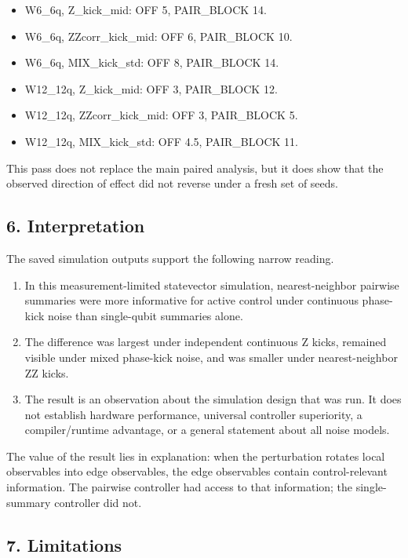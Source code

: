 \documentclass[
]{article}
\providecommand{\tightlist}{%
  \setlength{\itemsep}{0pt}\setlength{\parskip}{0pt}}
\begin{document}
\begin{itemize}
\tightlist
\item
  W6\_6q, Z\_kick\_mid: OFF 5, PAIR\_BLOCK 14.
\item
  W6\_6q, ZZcorr\_kick\_mid: OFF 6, PAIR\_BLOCK 10.
\item
  W6\_6q, MIX\_kick\_std: OFF 8, PAIR\_BLOCK 14.
\item
  W12\_12q, Z\_kick\_mid: OFF 3, PAIR\_BLOCK 12.
\item
  W12\_12q, ZZcorr\_kick\_mid: OFF 3, PAIR\_BLOCK 5.
\item
  W12\_12q, MIX\_kick\_std: OFF 4.5, PAIR\_BLOCK 11.
\end{itemize}

This pass does not replace the main paired analysis, but it does show
that the observed direction of effect did not reverse under a fresh set
of seeds.

\subsection{6. Interpretation}\label{interpretation}

The saved simulation outputs support the following narrow reading.

\begin{enumerate}
\def\labelenumi{\arabic{enumi}.}
\tightlist
\item
  In this measurement-limited statevector simulation, nearest-neighbor
  pairwise summaries were more informative for active control under
  continuous phase-kick noise than single-qubit summaries alone.
\item
  The difference was largest under independent continuous Z kicks,
  remained visible under mixed phase-kick noise, and was smaller under
  nearest-neighbor ZZ kicks.
\item
  The result is an observation about the simulation design that was run.
  It does not establish hardware performance, universal controller
  superiority, a compiler/runtime advantage, or a general statement
  about all noise models.
\end{enumerate}

The value of the result lies in explanation: when the perturbation
rotates local observables into edge observables, the edge observables
contain control-relevant information. The pairwise controller had access
to that information; the single-summary controller did not.

\subsection{7. Limitations}\label{limitations}
\end{document}
